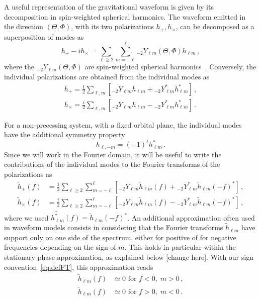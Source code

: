\documentclass[aps,showpacs,twocolumn,
prd,superscriptaddress,nofootinbib]{revtex4-1}
\newcommand{\be}{\begin{equation}}
\newcommand{\ee}{\end{equation}}
\newcommand{\nn}{\nonumber}
\newcommand{\SM}[1]{{\color{Red} #1}}
\begin{document}
A useful representation of the gravitational waveform is given by its decomposition in spin-weighted spherical harmonics. The waveform emitted in the direction $(\Theta, \Phi)$, with its two polarizations $h_{+},h_{\times}$, can be decomposed as a superposition of modes as~\cite{Thorne80}
\be\label{eq:defmodes}
	h_{+} - i h_{\times} = \sum\limits_{\ell \geq 2} \sum\limits_{m=-\ell}^{\ell} {}_{-2}Y_{\ell m}(\Theta,\Phi) h_{\ell m} \,,
\ee
where the ${}_{-2}Y_{\ell m}(\Theta,\Phi)$ are spin-weighted spherical harmonics~\cite{Goldberg+67}. Conversely, the individual polarizations are obtained from the individual modes as
\begin{subequations}
\begin{align}
	h_{+} = \frac{1}{2} \sum\limits_{\ell, m} \left[ {}_{-2}Y_{\ell m}h_{\ell m} + {}_{-2}Y_{\ell m}^{*} h_{\ell m}^{*} \right] \,,\\
	h_{\times} = \frac{i}{2} \sum\limits_{\ell, m} \left[ {}_{-2}Y_{\ell m}h_{\ell m} - {}_{-2}Y_{\ell m}^{*} h_{\ell m}^{*} \right] \,.
\end{align}
\end{subequations}

For a non-precessing system, with a fixed orbital plane, the individual modes have the additional symmetry property
\be\label{eq:symmetryhlminusm}
	h_{\ell, -m} = (-1)^{\ell} h_{\ell m}^{*} \,.
\ee
Since we will work in the Fourier domain, it will be useful to write the contributions of the individual modes to the Fourier transforms of the polarizations as
\begin{subequations}\label{eq:hpcfrommodes}
\begin{align}
	\tilde{h}_{+}(f) &= \frac{1}{2} \sum\limits_{\ell \geq 2} \sum\limits_{m=-\ell}^{\ell} \left[ {}_{-2}Y_{\ell m} \tilde{h}_{\ell m}(f) + {}_{-2}Y_{\ell m}^{*} \tilde{h}_{\ell m}(-f)^{*} \right] \,, \\
	\tilde{h}_{\times}(f) &= \frac{i}{2} \sum\limits_{\ell \geq 2} \sum\limits_{m=-\ell}^{\ell} \left[ {}_{-2}Y_{\ell m} \tilde{h}_{\ell m}(f) - {}_{-2}Y_{\ell m}^{*} \tilde{h}_{\ell m}(-f)^{*} \right] \,,
\end{align}
\end{subequations}
where we used $\widetilde{h_{\ell m}^{*}}(f) = \tilde{h}_{\ell m}(-f)^{*}$. An additional approximation often used in waveform models consists in considering that the Fourier transforms $\tilde{h}_{\ell m}$ have support only on one side of the spectrum, either for positive of for negative frequencies depending on the sign of $m$. This holds in particular within the stationary phase approximation, as explained below \SM{[change here]}. With our sign convention~\eqref{eq:defFT}, this approximation reads
\begin{align}\label{eq:zeronegativef}
	\tilde{h}_{\ell m} (f) &\simeq 0 \text{ for } f<0, \; m>0 \nn\,,\\
	\tilde{h}_{\ell m} (f) &\simeq 0 \text{ for } f>0, \; m<0 \,.
\end{align}
\end{document}
